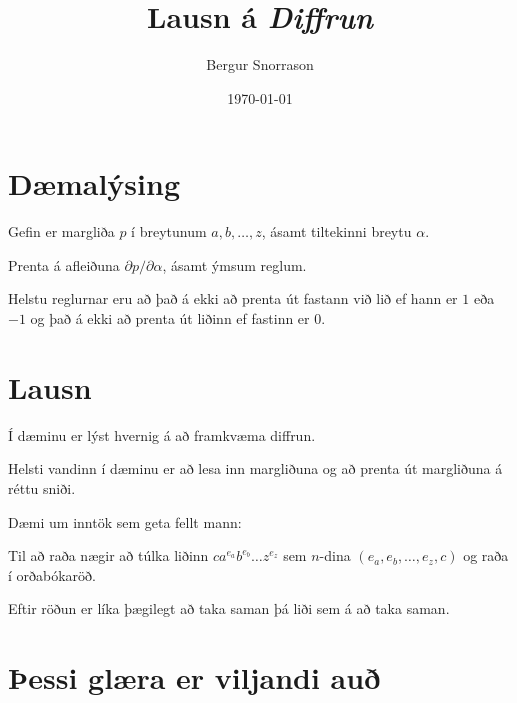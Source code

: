 \title{Lausn á \emph{Diffrun}}
\author{Bergur Snorrason}
\date{\today}



\frame{\titlepage}

\section{Dæmalýsing}
{
	{
		\item<1-> Gefin er margliða $p$ í breytunum $a, b, \dots, z$, ásamt tiltekinni breytu $\alpha$.
		\item<2-> Prenta á afleiðuna $\partial p/\partial \alpha$, ásamt ýmsum reglum.
		\item<3-> Helstu reglurnar eru að það á ekki að prenta út fastann við lið ef hann er $1$ eða $-1$
					og það á ekki að prenta út liðinn ef fastinn er $0$.
	}
}

\section{Lausn}
{
	{
		\item<1-> Í dæminu er lýst hvernig á að framkvæma diffrun.
		\item<2-> Helsti vandinn í dæminu er að lesa inn margliðuna og að prenta út margliðuna á réttu sniði.
		\item<3-> Dæmi um inntök sem geta fellt mann:
		\item<4->[] 
		\item<5->[] 
		\item<6->[] 
		\item<7->[] 
		\item<8-> Til að raða nægir að túlka liðinn $ca^{e_a}b^{e_b} \dots z^{e_z}$ sem $n$-dina $(e_a, e_b, \dots, e_z, c)$ og raða í orðabókaröð.
		\item<9-> Eftir röðun er líka þægilegt að taka saman þá liði sem á að taka saman.
	}
}

\section{Þessi glæra er viljandi auð}
{
}


